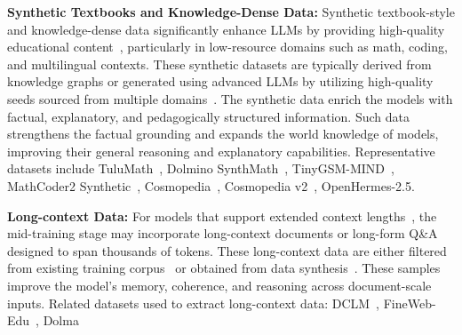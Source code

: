 
\noindent\textbf{Synthetic Textbooks and Knowledge-Dense Data:}
Synthetic textbook-style and knowledge-dense data significantly enhance LLMs by providing high-quality educational content~\cite{abdin2024phi, allal2025smollm2, glorioso2024zamba, hu2024minicpm, sun2024hunyuan, gunter2024apple, olmo20242, yang2025qwen3}, particularly in low-resource domains such as math, coding, and multilingual contexts. These synthetic datasets are typically derived from knowledge graphs or generated using advanced LLMs by utilizing high-quality seeds sourced from multiple domains~\cite{abdin2024phi}. The synthetic data enrich the models with factual, explanatory, and pedagogically structured information. Such data strengthens the factual grounding and expands the world knowledge of models, improving their general reasoning and explanatory capabilities. 
Representative datasets include TuluMath~\cite{olmo20242}, Dolmino SynthMath~\cite{olmo20242}, TinyGSM-MIND~\cite{olmo20242}, MathCoder2 Synthetic~\cite{olmo20242}, Cosmopedia~\cite{benallal2024cosmopedia}, Cosmopedia v2~\cite{benallal2024smollmcorpus}, OpenHermes-2.5.

\noindent\textbf{Long-context Data:}
For models that support extended context lengths~\cite{yang2025qwen3, chen2025minimax, sun2024hunyuan, abdin2024phi}, the mid-training stage may incorporate long-context documents or long-form Q\&A designed to span thousands of tokens. 
These long-context data are either filtered from existing training corpus~\cite{sun2024hunyuan, abdin2024phi, allal2025smollm2, gao2024train} or obtained from data synthesis~\cite{abdin2024phi}. These samples improve the model’s memory, coherence, and reasoning across document-scale inputs.
Related datasets used to extract long-context data: DCLM~\cite{NEURIPS2024_19e4ea30}, FineWeb-Edu~\cite{penedo2024fineweb}, Dolma~\cite{soldaini2024dolma}




